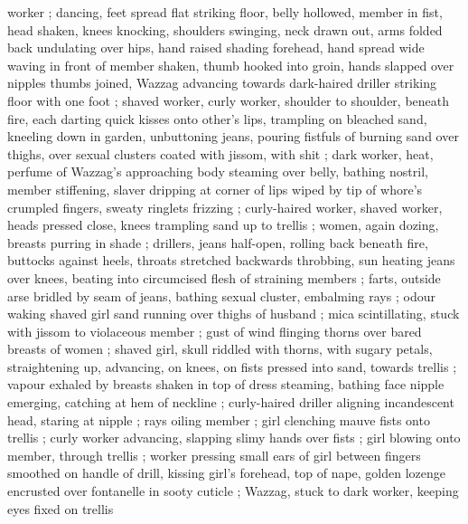 worker ; dancing, feet spread flat striking floor, belly hollowed, member in fist, head shaken, knees knocking, shoulders swinging, neck drawn out, arms folded back undulating over hips, hand raised shading forehead, hand spread wide waving in front of member shaken, thumb hooked into groin, hands slapped over nipples thumbs joined, Wazzag advancing towards dark-haired driller striking floor with one foot ; shaved worker, curly worker, shoulder to shoulder, beneath fire, each darting quick kisses onto other's lips, trampling on bleached sand, kneeling down in garden, unbuttoning jeans, pouring fistfuls of burning sand over thighs, over sexual clusters coated with jissom, with shit ; dark worker, heat, perfume of Wazzag's approaching body steaming over belly, bathing nostril, member stiffening, slaver dripping at corner of lips wiped by tip of whore's crumpled fingers, sweaty ringlets frizzing ; curly-haired worker, shaved worker, heads pressed close, knees trampling sand up to trellis ; women, again dozing, breasts purring in shade ; drillers, jeans half-open, rolling back beneath fire, buttocks against heels, throats stretched backwards throbbing, sun heating jeans over knees, beating into circumcised flesh of straining members ; farts, outside arse bridled by seam of jeans, bathing sexual cluster, embalming rays ; odour waking shaved girl {\col} sand running over thighs of husband ; mica scintillating, stuck with jissom to violaceous member ; gust of wind flinging thorns over bared breasts of women ; shaved girl, skull riddled with thorns, with sugary petals, straightening up, advancing, on knees, on fists pressed into sand, towards trellis ; vapour exhaled by breasts shaken in top of dress steaming, bathing face {\col} nipple emerging, catching at hem of neckline ; curly-haired driller aligning incandescent head, staring at nipple ; rays oiling member ; girl clenching mauve fists onto trellis ; curly worker advancing, slapping slimy hands over fists ; girl blowing onto member, through trellis ; worker pressing small ears of girl between fingers smoothed on handle of drill, kissing girl's forehead, top of nape, golden lozenge encrusted over fontanelle in sooty cuticle ; Wazzag, stuck to dark worker, keeping eyes fixed on trellis {\col}

